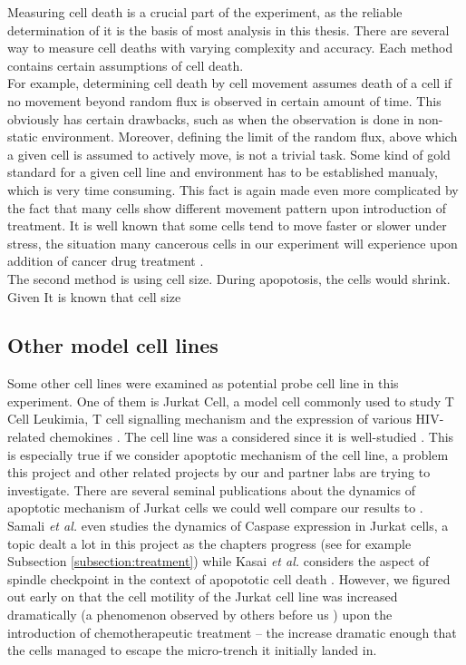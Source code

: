 \documentclass[pdftex,12pt,a4paper]{report}
\begin{document}

Measuring cell death is a crucial part of the experiment, as the reliable determination of it is the basis of most analysis in this thesis. There are several way to measure cell deaths with varying complexity and accuracy. Each method contains certain assumptions of cell death.\\

For example, determining cell death by cell movement assumes death of a cell if no movement beyond random flux is observed in certain amount of time. This obviously has certain drawbacks, such as when the observation is done in non-static environment. Moreover, defining the limit of the random flux, above which a given cell is assumed to actively move, is not a trivial task. Some kind of gold standard for a given cell line and environment has to be established manualy, which is very time consuming. This fact is again made even more complicated by the fact that many cells show different movement pattern upon introduction of treatment. It is well known that some cells tend to move faster or slower under stress, the situation many cancerous cells in our experiment will experience upon addition of cancer drug treatment \cite{pienta1991effects, fenteany2003small, ruocco2012suppressing}.\\

The second method is using cell size. During apopotosis, the cells would shrink. Given It is known that cell size %

\subsection{Other model cell lines}



Some other cell lines were examined as potential probe cell line in this experiment. One of them is Jurkat Cell, a model cell commonly used to study T Cell Leukimia, T cell signalling mechanism and the expression of various HIV-related chemokines \cite{schneider1977characterization}. The cell line was a considered since it is well-studied \cite{johnson2007genome, schena1996parallel}. This is especially true if we consider apoptotic mechanism of the cell line, a problem this project and other related projects by our  and partner labs are trying to investigate. There are several seminal publications about the dynamics of apoptotic mechanism of Jurkat cells we could well compare our results to \cite{gottlieb1996apoptosis}. Samali \textit{et al.} \cite{samali1999presence} even studies the dynamics of Caspase expression in Jurkat cells, a topic dealt a lot in this project as the chapters progress (see for example Subsection \ref{subsection:treatment}) while Kasai \textit{et al.} considers the aspect of spindle checkpoint in the context of apopototic cell death \cite{kasai2002prevalent}. However, we figured out early on that the cell motility of the Jurkat cell line was increased dramatically (a phenomenon observed by others before us \cite{barnhart2004cd95}) upon the introduction of chemotherapeutic treatment -- the increase dramatic enough that the cells managed to escape the micro-trench it initially landed in.
\end{document}
